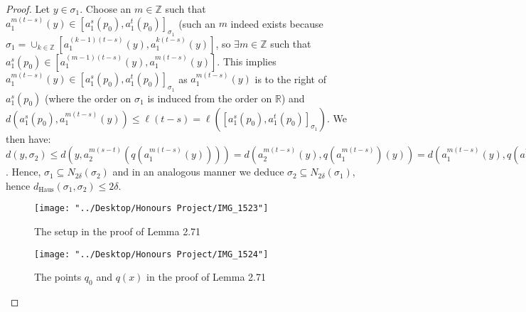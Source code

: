 \documentclass[12pt]{article}
\newcommand{\vs}{\vskip10pt}
\begin{document}
\begin{proof}
		\vs 
		
		Let $y \in \sigma_1$.  Choose an $m \in \mathbb{Z}$ such that $a_1^{m(t-s)} (y) \in [a_1^s (p_0), a_1^t (p_0)]_{\sigma_1}$ (such an $m$ indeed exists because $\sigma_1 = \cup_{k \in \mathbb{Z}} [a_1^{(k-1)(t-s)}(y), a_1^{k(t-s)}(y)]$, so $\exists m \in \mathbb{Z}$ such that $a_1^s(p_0) \in [a_1^{(m-1)(t-s)}(y), a_1^{m(t-s)}(y)]$. This implies $a_1^{m(t-s)}(y) \in [a_1^s(p_0), a_1^t (p_0)]_{\sigma_1}$ as $a_1^{m(t-s)}(y)$ is to the right of $a_1^s(p_0)$ (where the order on $\sigma_1$ is induced from the order on $\mathbb{R}$) and $d(a_1^s (p_0), a_1^{m(t-s)}(y)) \leq \ell (t - s) = \ell([a_1^s(p_0), a_1^t (p_0)]_{\sigma_1})$. We then have: $d(y, \sigma_2) \leq d(y, a_2^{m(s-t)}(q(a_1^{m(t-s)}(y)))) = d(a_2^{m(t-s)}(y), q(a_1^{m(t-s)})(y)) = d(a_1^{m(t-s)}(y), q(a_1^{m(t-s)})(y)) \leq 2 \delta$. Hence, $\sigma_1 \subseteq N_{2 \delta} (\sigma_2)$ and in an analogous manner we deduce $\sigma_2 \subseteq N_{2 \delta}(\sigma_1)$, hence $d_{\text{Haus}}(\sigma_1, \sigma_2) \leq 2 \delta$. 
		
		
		
\begin{figure} [H]
	\centering
	\texttt{[image: "../Desktop/Honours Project/IMG\_1523"]}
	\caption{The setup in the proof of Lemma 2.71}
	\label{fig:img1523}
\end{figure}

\begin{figure} [H]
	\centering
	\texttt{[image: "../Desktop/Honours Project/IMG\_1524"]}
	\caption{The points $q_0$ and $q(x)$ in the proof of Lemma 2.71}
	\label{fig:img1524}
\end{figure}
		
	\end{proof}
\end{document}
